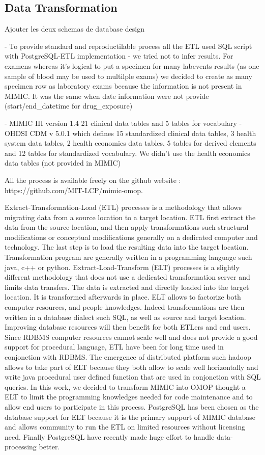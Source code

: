 \subsection{Data Transformation}

Ajouter les deux schemas de database design

- To provide standard and reproductilable process all the ETL used SQL script
  with PostgreSQL-ETL implementation
- we tried  not to infer results. For examens whereas it's logical to put a
  specimen for many labevents results (as one sample of blood may be used to
  multilple exams) we decided to create as many specimen row as laboratory
  exams because the information is not present in MIMIC. It was the same when
  date information were not provide (start/end_datetime for drug_exposure)

- MIMIC III version 1.4 21 clinical data tables and 5 tables for vocabulary
- OHDSI CDM v 5.0.1 which defines 15 standardized clinical data tables, 3 health system data tables, 2 health economics data tables, 5 tables for derived elements and 12 tables for standardized vocabulary. 
  We didn’t use the health economics data tables (not provided in MIMIC)

All the process is available freely on the github website : https://github.com/MIT-LCP/mimic-omop.

Extract-Transformation-Load (ETL) processes is a methodology that allows
migrating data from a source location to a target location. ETL first extract
the data from the source location, and then apply transformations such
structural modifications or conceptual modifications generally on a dedicated
computer and technology. The last step is to load the resulting data into the
target location. Transformation program are generally written in a programming
language such java, c++ or python.
Extract-Load-Transform (ELT) processes is a slightly different methodology that
does not use a dedicated transformation server and limits data transfers. The
data is extracted and directly loaded into the target location. It is
transformed afterwards in place. ELT allows to factorize both computer
resources, and people knowledges. Indeed transformations are then written in a
database dialect such SQL, as well as source and target location. Improving
database resources will then benefit for both ETLers and end users. Since RDBMS
computer resources cannot scale well and does not provide a good support for
procedural language, ETL have been for long time used in conjonction with
RDBMS. The emergence of distributed platform such hadoop allows to take part
of ELT because they both allow to scale well horizontally and write java
procedural user defined function that are used in conjonction with SQL queries.
In this work, we decided to transform MIMIC into OMOP thought a ELT to limit
the programming knowledges needed for code maintenance and to allow end users
to participate in this process. PostgreSQL has been chosen as the database
support for ELT because it is the primary support of MIMIC database and allows
community to run the ETL on limited resources without licensing need. Finally
PostgreSQL have recently made huge effort to handle data-processing better.

